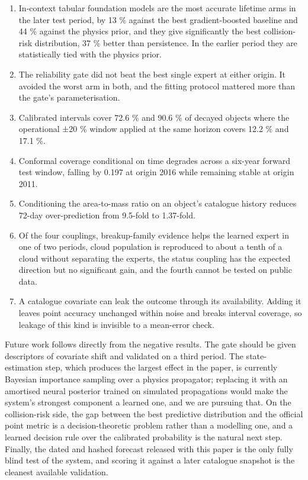 \documentclass[3p,times,twocolumn]{elsarticle}
\providecommand{\tightlist}{\setlength{\itemsep}{0pt}\setlength{\parskip}{0pt}}
\providecommand{\tightlist}{\setlength{\itemsep}{0pt}\setlength{\parskip}{0pt}}
\begin{document}
\begin{enumerate}
\def\labelenumi{\arabic{enumi}.}
\tightlist
\item
  In-context tabular foundation models are the most accurate lifetime
  arms in the later test period, by 13 \% against the best
  gradient-boosted baseline and 44 \% against the physics prior, and
  they give significantly the best collision-risk distribution, 37 \%
  better than persistence. In the earlier period they are statistically
  tied with the physics prior.
\item
  The reliability gate did not beat the best single expert at either
  origin. It avoided the worst arm in both, and the fitting protocol
  mattered more than the gate's parameterisation.
\item
  Calibrated intervals cover 72.6 \% and 90.6 \% of decayed objects
  where the operational ±20 \% window applied at the same horizon covers
  12.2 \% and 17.1 \%.
\item
  Conformal coverage conditional on time degrades across a six-year
  forward test window, falling by 0.197 at origin 2016 while remaining
  stable at origin 2011.
\item
  Conditioning the area-to-mass ratio on an object's catalogue history
  reduces 72-day over-prediction from 9.5-fold to 1.37-fold.
\item
  Of the four couplings, breakup-family evidence helps the learned
  expert in one of two periods, cloud population is reproduced to about
  a tenth of a cloud without separating the experts, the status coupling
  has the expected direction but no significant gain, and the fourth
  cannot be tested on public data.
\item
  A catalogue covariate can leak the outcome through its availability.
  Adding it leaves point accuracy unchanged within noise and breaks
  interval coverage, so leakage of this kind is invisible to a
  mean-error check.
\end{enumerate}

Future work follows directly from the negative results. The gate should
be given descriptors of covariate shift and validated on a third period.
The state-estimation step, which produces the largest effect in the
paper, is currently Bayesian importance sampling over a physics
propagator; replacing it with an amortised neural posterior trained on
simulated propagations would make the system's strongest component a
learned one, and we are pursuing that. On the collision-risk side, the
gap between the best predictive distribution and the official point
metric is a decision-theoretic problem rather than a modelling one, and
a learned decision rule over the calibrated probability is the natural
next step. Finally, the dated and hashed forecast released with this
paper is the only fully blind test of the system, and scoring it against
a later catalogue snapshot is the cleanest available validation.
\end{document}
